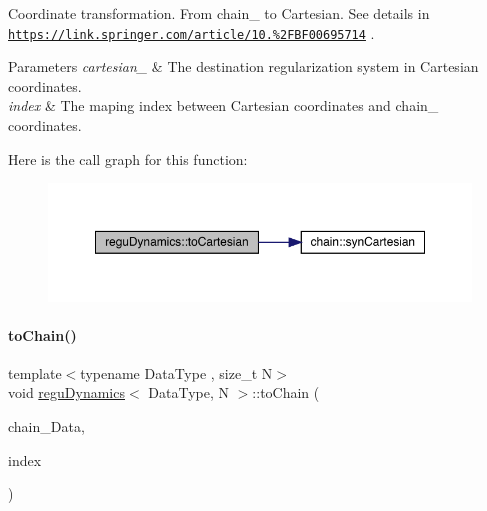 Coordinate transformation. From chain_ to Cartesian. See details in \href{https://link.springer.com/article/10.1007%2FBF00695714}{\tt https\+://link.\+springer.\+com/article/10.\%2\+F\+B\+F00695714} .
\begin{DoxyParams}{Parameters}
{\em cartesian_} & The destination regularization system in Cartesian coordinates. \\
\hline
{\em index} & The maping index between Cartesian coordinates and chain_ coordinates. \\
\hline
\end{DoxyParams}
Here is the call graph for this function\+:\nopagebreak
\begin{figure}[H]
\begin{center}
\leavevmode
\includegraphics[width=350pt]{classregu_dynamics_a3dd8d377588308a02396ca6d06945859_cgraph}
\end{center}
\end{figure}
\mbox{\label{classregu_dynamics_aae4e77bbbb00f0bdddb396047f1c0fc2}} 
\paragraph{\texorpdfstring{to\+Chain()}{toChain()}}
{\footnotesize\ttfamily template$<$typename Data\+Type , size\+\_\+t N$>$ \\
void \mbox{\hyperlink{classregu_dynamics}{regu\+Dynamics}}$<$ Data\+Type, N $>$\+::to\+Chain (\begin{DoxyParamCaption}\item[{\mbox{\hyperlink{classregu_dynamics}{regu\+Dynamics}}$<$ Data\+Type, N $>$ \&}]{chain_\+Data,  }\item[{\mbox{\hyperlink{classregu_dynamics_a2c9fa7372e4a11be9d85728b4a0e455f}{Index\+Array}} \&}]{index }\end{DoxyParamCaption})\hspace{0.3cm}{\ttfamily [inline]}}



